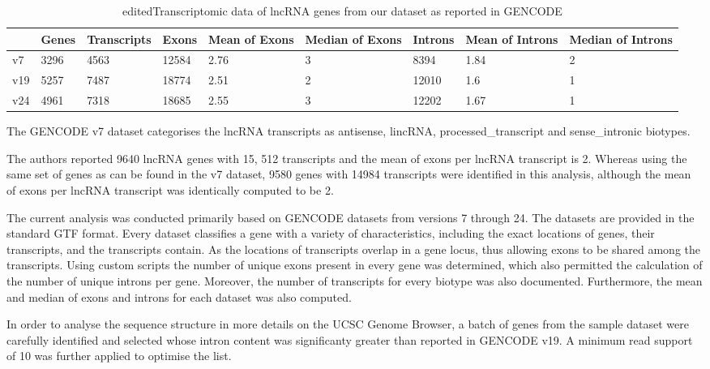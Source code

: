 \documentclass[ncrna,article,submit,moreauthors,pdftex,10pt,a4paper]{mdpi}
\newcommand{\update}[1]{\begingroup\color{blue}#1\endgroup}
\begin{document}
\begin{table}[ht]
\centering
{\tiny
\begin{tabular}[lrrrrrrrr]{p{}|p{}p{}p{}p{}
p{}p{}p{}p{}}
  \hline
 & Genes & Transcripts & Exons & Mean of Exons & Median of Exons & Introns & Mean of Introns & Median of Introns \\ 
   \hline
v7 & 3296 & 4563 & 12584 & 2.76 & 3 & 8394 & 1.84 & 2\\
  v19 & 5257 & 7487 & 18774 & 2.51 & 2 & 12010 & 1.6 & 1\\
  v24 & 4961 & 7318 & 18685 & 2.55 & 3 & 12202 & 1.67 & 1\\ 
   \hline
\end{tabular}
}
\caption{\update{edited}Transcriptomic data of lncRNA genes from our dataset as reported in GENCODE} 
\end{table}%



The GENCODE v7 dataset categorises the lncRNA transcripts as antisense, lincRNA, processed\_transcript and sense\_intronic biotypes. 

The authors reported 9640 lncRNA genes with 15, 512 transcripts and the mean of exons per lncRNA transcript is 2.
Whereas using the same set of genes as can be found in the v7 dataset, 9580 genes with 14984 transcripts were identified in this analysis, although 
the mean of exons per lncRNA transcript was identically computed to be 2.


The current analysis was conducted primarily based on GENCODE datasets from versions 7 through 24. 
The datasets are provided in the standard GTF format. Every dataset classifies a gene with a variety of characteristics, including
the exact locations of genes, their transcripts, and the transcripts contain. As the locations of transcripts overlap in a
gene locus, thus allowing exons to be shared among the transcripts.
Using custom scripts the number of unique exons present in every gene was determined, which also permitted the calculation
of the number of unique introns per gene. Moreover, the number of transcripts for every biotype was also documented.
Furthermore, the mean and median of exons and introns for each dataset was
also computed.


In order to analyse the sequence structure in more details on the UCSC Genome Browser, a batch of genes from the sample dataset 
were carefully identified and selected whose intron content was significanty greater than reported in GENCODE v19. A minimum read support of 10
was further applied to optimise the list.
\end{document}
